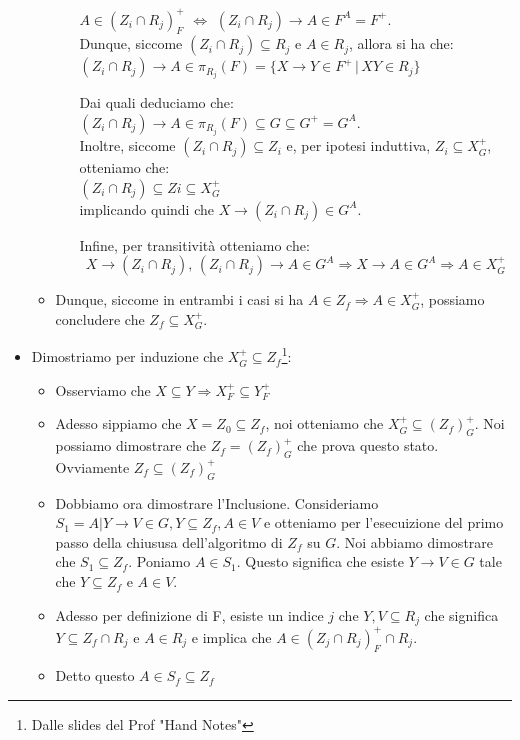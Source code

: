 \documentclass{article}
\begin{document}
\begin{itemize}
\begin{itemize}
\begin{itemize}
      $A \in (Z_i \cap R_j)^+_F$ $\Leftrightarrow$ $(Z_i \cap R_j) \rightarrow A \in F^A = F^+$. \\
      
      Dunque, siccome $(Z_i \cap R_j) \subseteq R_j$ e $A \in R_j$, allora si ha che:\\

        $(Z_i \cap R_j) \rightarrow A \in \pi_{R_j}(F) = \{X \rightarrow Y \in F^+ \,|\, XY \in R_j\}$
      
      
    Dai quali deduciamo che:\\

    $(Z_i \cap R_j) \rightarrow A \in \pi_{R_j}(F) \subseteq G \subseteq G^+ = G^A$.\\

    Inoltre, siccome $(Z_i \cap R_j) \subseteq Z_i$ e, per ipotesi induttiva, $Z_i \subseteq X_G^+$, otteniamo che:\\ 
    
    $(Z_i \cap R_j) \subseteq Zi \subseteq X_G^+$ \\
    
    implicando quindi che $X \rightarrow (Z_i \cap R_j) \in G^A$.

    Infine, per transitività otteniamo che:
    \[ X \rightarrow (Z_i \cap R_j), \, (Z_i \cap R_j) \rightarrow A \in G^A \Rightarrow X \rightarrow A \in G^A \Rightarrow A \in X_G^+ \]
    \end{itemize}  
    \item Dunque, siccome in entrambi i casi si ha $A \in Z_f \Rightarrow A \in X_G^+$, possiamo concludere che $Z_f \subseteq X_G^+$.

  \end{itemize}
  \item Dimostriamo per induzione che $X_G^+ \subseteq Z_f$\footnote{Dalle slides del Prof "Hand Notes"}:
  \begin{itemize}
    \item Osserviamo che $X \subseteq Y \Rightarrow X_F^+ \subseteq Y^+_F$
    \item Adesso sippiamo che $X = Z_0 \subseteq Z_f$, noi otteniamo che $X_G^+ \subseteq (Z_f)^+_G$. Noi possiamo dimostrare che $Z_f = (Z_f)^+_G$ che prova questo stato. Ovviamente $Z_f \subseteq (Z_f)^+_G$
    \item Dobbiamo ora dimostrare l'Inclusione. Consideriamo $S_1 = { A | Y \rightarrow V \in G, Y \subseteq Z_f, A \in V }$ e otteniamo per l'esecuizione del primo passo della chiususa dell'algoritmo di $Z_f$ su $G$. Noi abbiamo dimostrare che $S_1 \subseteq Z_f$. Poniamo $A \in S_1$. Questo significa che esiste $Y \rightarrow V \in G$ tale che $Y \subseteq Z_f$ e $A \in V$.
    \item Adesso per definizione di F, esiste un indice $j$ che $Y, V \subseteq R_j$ che significa $Y \subseteq Z_f \cap R_j$ e $A \in R_j$ e implica che $A \in (Z_j \cap R_j)^+_F \cap R_j$.
    \item Detto questo $A \in S_f \subseteq Z_f$ 
  \end{itemize}
\end{itemize}
\end{document}
